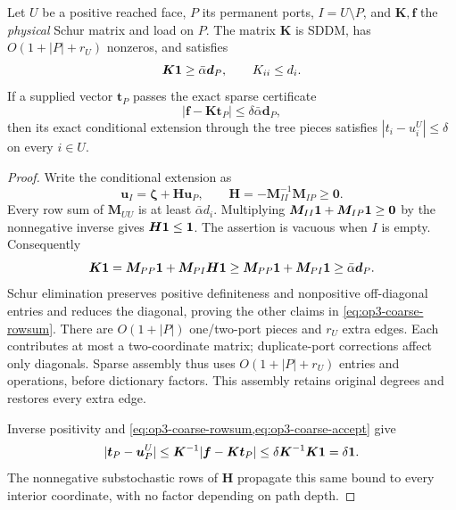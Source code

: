\begin{lemma}
\label{lem:op3-coarse-error-certificate}
Let $U$ be a positive reached face, $P$ its permanent ports, $I=U\setminus P$,
and $\bm K,\bm f$ the \emph{physical} Schur matrix and load on $P$.
The matrix $\bm K$ is SDDM, has $O(1+|P|+r_U)$ nonzeros, and satisfies
\begin{equation}
 \bm K\mathbf{1}\geq\bar\alpha\bm d_P,\qquad
 K_{ii}\leq d_i.
 \label{eq:op3-coarse-rowsum}
\end{equation}
If a supplied vector $\bm t_P$ passes the exact sparse certificate
\begin{equation}
 |\bm f-\bm K\bm t_P|\leq\delta\bar\alpha\bm d_P,
 \label{eq:op3-coarse-accept}
\end{equation}
then its exact conditional extension through the tree pieces satisfies
$|t_i-u_i^U|\leq\delta$ on every $i\in U$.
\end{lemma}
\begin{proof}
Write the conditional extension as
\[
 \bm u_I=\bm\zeta+\bm H\bm u_P,\qquad
 \bm H=-\bm M_{II}^{-1}\bm M_{IP}\geq\bm0.
\]
Every row sum of $\bm M_{UU}$ is at least $\bar\alpha d_i$.
Multiplying $\bm M_{II}\mathbf{1}+\bm M_{IP}\mathbf{1}\geq\bm0$ by the
nonnegative inverse gives $\bm H\mathbf{1}\leq\mathbf{1}$.
The assertion is vacuous when $I$ is empty. Consequently
\[
 \bm K\mathbf{1}=\bm M_{PP}\mathbf{1}+\bm M_{PI}\bm H\mathbf{1}
 \geq\bm M_{PP}\mathbf{1}+\bm M_{PI}\mathbf{1}
 \geq\bar\alpha\bm d_P.
\]
Schur elimination preserves positive definiteness and nonpositive
off-diagonal entries and reduces the diagonal, proving the other claims
in \cref{eq:op3-coarse-rowsum}. There are $O(1+|P|)$ one/two-port pieces
and $r_U$ extra edges. Each contributes at most a two-coordinate matrix;
duplicate-port corrections affect only diagonals. Sparse assembly thus
uses $O(1+|P|+r_U)$ entries and operations, before dictionary factors.
This assembly retains original degrees and restores every extra edge.

Inverse positivity and \cref{eq:op3-coarse-rowsum,eq:op3-coarse-accept}
give
\[
 |\bm t_P-\bm u_P^U|
 \leq\bm K^{-1}|\bm f-\bm K\bm t_P|
 \leq\delta\bm K^{-1}\bm K\mathbf{1}=\delta\mathbf{1}.
\]
The nonnegative substochastic rows of $\bm H$ propagate this same bound
to every interior coordinate, with no factor depending on path depth.
\end{proof}

